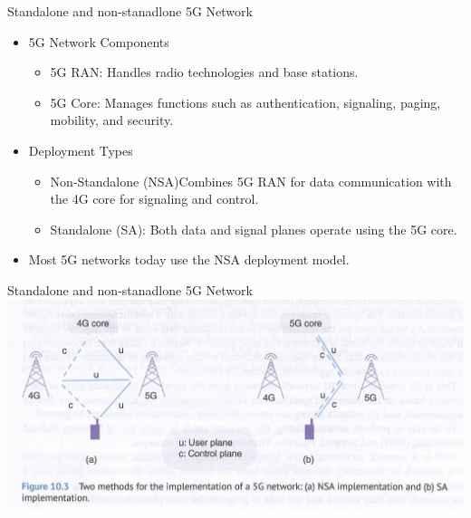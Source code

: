 \documentclass{beamer}
\begin{document}
\begin{frame}{Standalone and non-stanadlone 5G Network}
  \vspace*{1.6em}
  \begin{itemize}
    \item 5G Network Components
    \begin{itemize}
        \item 5G RAN: Handles radio technologies and base stations.
        \item 5G Core: Manages functions such as authentication, signaling, paging, mobility, and security.
    \end{itemize}
    \item Deployment Types
    \begin{itemize}
        \item Non-Standalone (NSA)Combines 5G RAN for data communication with the 4G core for signaling and control.
        \item Standalone (SA): Both data and signal planes operate using the 5G core.
    \end{itemize}
    \item Most 5G networks today use the NSA deployment model.
  \end{itemize}
\end{frame}

\begin{frame}{Standalone and non-stanadlone 5G Network}
  \hspace*{0.6em}
  \includegraphics[scale=0.33]{beamer/fig/standalone_and_not.png}
\end{frame}
\end{document}
